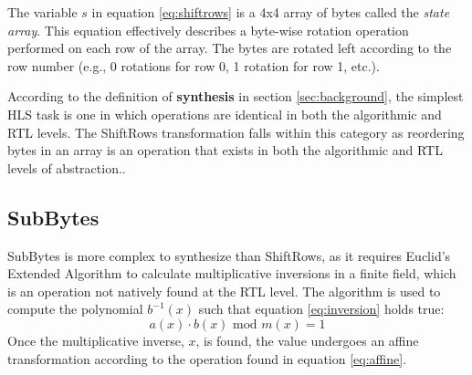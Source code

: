 \documentclass[11pt,journal,compsoc, onecolumn]{IEEEtran}
\begin{document}
The variable $s$ in equation \ref{eq:shiftrows} is a 4x4 array of bytes called the \emph{state array}\cite{13}. This equation effectively describes a byte-wise rotation operation performed on each row of the array. The bytes are rotated left according to the row number (e.g., 0 rotations for row 0, 1 rotation for row 1, etc.). 

According to the definition of \textbf{synthesis} in section \ref{sec:background}, the simplest HLS task is one in which operations are identical in both the algorithmic and RTL levels. The ShiftRows transformation falls within this category as reordering bytes in an array is an operation that exists in both the algorithmic and RTL levels of abstraction.\cite{silva}. 

\subsection{SubBytes}
SubBytes is more complex to synthesize than ShiftRows, as it requires Euclid's Extended Algorithm to calculate multiplicative inversions in a finite field, which is an operation not natively found at the RTL level. The algorithm is used to compute the polynomial $b^{-1}(x)$ such that equation \ref{eq:inversion} holds true:
\begin{equation}\label{eq:inversion}
	a(x)\cdot b(x)\text{ mod }m(x)=1
\end{equation}
Once the multiplicative inverse, $x$, is found, the value undergoes an affine transformation according to the operation found in equation \ref{eq:affine}.
\end{document}
